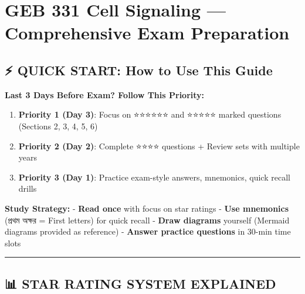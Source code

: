 \hypertarget{geb-331-cell-signaling-comprehensive-exam-preparation}{%
\chapter{GEB 331 Cell Signaling --- Comprehensive Exam
Preparation}\label{geb-331-cell-signaling-comprehensive-exam-preparation}}

\hypertarget{quick-start-how-to-use-this-guide}{%
\section{⚡ QUICK START: How to Use This
Guide}\label{quick-start-how-to-use-this-guide}}

\textbf{Last 3 Days Before Exam? Follow This Priority:}

\begin{enumerate}
\def\labelenumi{\arabic{enumi}.}
\tightlist
\item
  \textbf{Priority 1 (Day 3)}: Focus on ⭐⭐⭐⭐⭐⭐ and ⭐⭐⭐⭐⭐
  marked questions (Sections 2, 3, 4, 5, 6)
\item
  \textbf{Priority 2 (Day 2)}: Complete ⭐⭐⭐⭐ questions + Review sets
  with multiple years
\item
  \textbf{Priority 3 (Day 1)}: Practice exam-style answers, mnemonics,
  quick recall drills
\end{enumerate}

\textbf{Study Strategy:} - \textbf{Read once} with focus on star ratings
- \textbf{Use mnemonics} (প্রথম অক্ষর = First letters) for quick recall -
\textbf{Draw diagrams} yourself (Mermaid diagrams provided as reference)
- \textbf{Answer practice questions} in 30-min time slots

\begin{center}\rule{0.5\linewidth}{0.5pt}\end{center}

\hypertarget{star-rating-system-explained}{%
\section{📊 STAR RATING SYSTEM
EXPLAINED}\label{star-rating-system-explained}}

